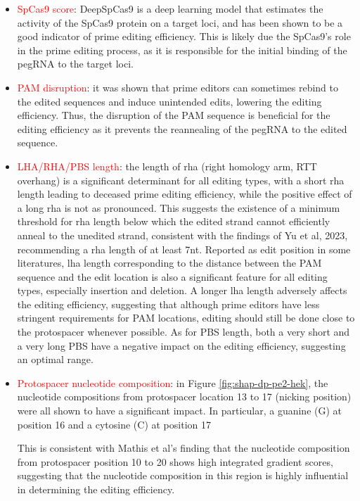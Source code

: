 \begin{itemize}[itemsep=-0mm]
    \item \textcolor{red}{SpCas9 score}: DeepSpCas9 is a deep learning model that estimates the activity of the SpCas9 protein on a target loci, and has been shown to be a good indicator of prime editing efficiency\cite{kimPredictingEfficiencyPrime2021}. This is likely due the SpCas9's role in the prime editing process, as it is responsible for the initial binding of the pegRNA to the target loci. 
    \item \textcolor{red}{PAM disruption}: it was shown that prime editors can sometimes rebind to the edited sequences and induce unintended edits, lowering the editing efficiency\cite{liudavidr.SearchandreplaceGenomeEditing2019}. Thus, the disruption of the PAM sequence is beneficial for the editing efficiency as it prevents the reannealing of the pegRNA to the edited sequence.
    \item \textcolor{red}{LHA/RHA/PBS length}: the length of rha (right homology arm, RTT overhang) is a significant determinant for all editing types, with a short rha length leading to deceased prime editing efficiency, while the positive effect of a long rha is not as pronounced. This suggests the existence of a minimum threshold for rha length below which the edited strand cannot efficiently anneal to the unedited strand, consistent with the findings of Yu et al, 2023, recommending a rha length of at least 7nt\cite{yuPredictionEfficienciesDiverse2023}. Reported as edit position in some literatures, lha length corresponding to the distance between the PAM sequence and the edit location is also a significant feature for all editing types, especially insertion and deletion. A longer lha length adversely affects the editing efficiency, suggesting that although prime editors have less stringent requirements for PAM locations, editing should still be done close to the protospacer whenever possible. As for PBS length, both a very short and a very long PBS have a negative impact on the editing efficiency, suggesting an optimal range.
    \item \textcolor{red}{Protospacer nucleotide composition}: in Figure \ref{fig:shap-dp-pe2-hek}, the nucleotide compositions from protospacer location 13 to 17 (nicking position) were all shown to have a significant impact. In particular, a guanine (G) at position 16 and a cytosine (C) at position 17
    
    This is consistent with Mathis et al's finding that the nucleotide composition from protospacer position 10 to 20 shows high integrated gradient scores, suggesting that the nucleotide composition in this region is highly influential in determining the editing efficiency\cite{mathisPredictingPrimeEditing2023}.
\end{itemize}

